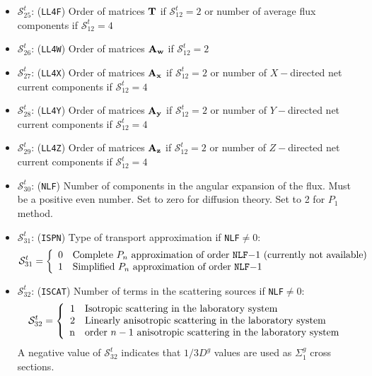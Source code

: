 \begin{itemize}
\item $\mathcal{S}^{t}_{25}$: ({\tt LL4F}) Order of matrices $\bf{T}$ if $\mathcal{S}^{t}_{12}=2$ or number of average flux components if $\mathcal{S}^{t}_{12}=4$

\item $\mathcal{S}^{t}_{26}$: ({\tt LL4W}) Order of matrices $\bf{A_w}$ if $\mathcal{S}^{t}_{12}=2$

\item $\mathcal{S}^{t}_{27}$: ({\tt LL4X}) Order of matrices $\bf{A_x}$ if $\mathcal{S}^{t}_{12}=2$ or number of $X-$directed net current components if $\mathcal{S}^{t}_{12}=4$

\item $\mathcal{S}^{t}_{28}$: ({\tt LL4Y}) Order of matrices $\bf{A_y}$ if $\mathcal{S}^{t}_{12}=2$ or number of $Y-$directed net current components if $\mathcal{S}^{t}_{12}=4$

\item $\mathcal{S}^{t}_{29}$: ({\tt LL4Z}) Order of matrices $\bf{A_z}$ if $\mathcal{S}^{t}_{12}=2$ or number of $Z-$directed net current components if $\mathcal{S}^{t}_{12}=4$

\item $\mathcal{S}^{t}_{30}$: ({\tt NLF}) Number of components in the angular expansion of the flux. Must be a positive
even number. Set to zero for diffusion theory. Set to 2 for $P_1$ method.

\item $\mathcal{S}^{t}_{31}$: ({\tt ISPN}) Type of transport approximation if {\tt NLF}$\ne 0$:
\begin{displaymath}
\mathcal{S}^{t}_{31} = \left\{
\begin{array}{rl}
 0 & \textrm{Complete $P_n$ approximation of order {\tt NLF}$-1$ (currently not available)}\\
 1 & \textrm{Simplified $P_n$ approximation of order {\tt NLF}$-1$}
\end{array} \right.
\end{displaymath}

\item $\mathcal{S}^{t}_{32}$: ({\tt ISCAT}) Number of terms in the scattering sources if {\tt NLF}$\ne 0$:
\begin{displaymath}
\mathcal{S}^{t}_{32} = \left\{
\begin{array}{rl}
 1 & \textrm{Isotropic scattering in the laboratory system} \\
 2 & \textrm{Linearly anisotropic scattering in the laboratory system} \\
 $n$ & \textrm{order $n-1$ anisotropic scattering in the laboratory system}
\end{array} \right.
\end{displaymath}
\noindent A negative value of $\mathcal{S}^{t}_{32}$ indicates that $1/3D^{g}$ values are used as $\Sigma_1^{g}$ cross sections.


\end{itemize}
